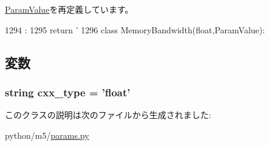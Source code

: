 \hyperlink{classm5_1_1params_1_1ParamValue_a33ebe6cd32bcbd15465fc28b9d94bf82}{ParamValue}を再定義しています。


\begin{DoxyCode}
1294                      :
1295         return '%
1296 
class MemoryBandwidth(float,ParamValue):
\end{DoxyCode}


\subsection{変数}
\hypertarget{classm5_1_1params_1_1NetworkBandwidth_a2f1553ebb79374a68b36fdd6d8d82fc3}{
\subsubsection[{cxx\_\-type}]{\setlength{\rightskip}{0pt plus 5cm}string {\bf cxx\_\-type} = 'float'}}
\label{classm5_1_1params_1_1NetworkBandwidth_a2f1553ebb79374a68b36fdd6d8d82fc3}


このクラスの説明は次のファイルから生成されました:\begin{DoxyCompactItemize}
\item 
python/m5/\hyperlink{params_8py}{params.py}\end{DoxyCompactItemize}
